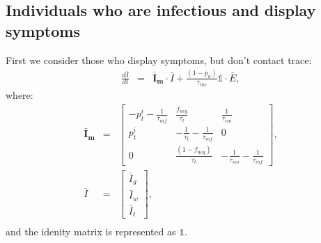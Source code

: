 \documentclass[notitlepage, superscriptaddress]{revtex4-2}
\begin{document}
\subsection{Individuals who are infectious and display symptoms}
First we consider those who display symptoms, but don't contact trace:
\begin{eqnarray}
\frac{d\bar{I}}{dt} &=& \boldsymbol{\bar{I}_{m}} \cdot  \bar{I} + \frac{(1-p_{a})}{\tau_{inc}} \mathbb{1} \cdot \bar{E}, 
\end{eqnarray}
where:
%
\begin{eqnarray}
\boldsymbol{\bar{I}_{m}} &=&
\begin{bmatrix}
- p^{i}_{t} -\frac{1}{\tau_{inf}}  &  \frac{f_{neg}}{\tau_{t}}            & \frac{1}{\tau_{iso}} \\ 
 p^{i}_{t}              & -\frac{1}{\tau_{t}} -\frac{1}{\tau_{inf}}       & 0  \\ 
 0                  & \frac{(1- f_{neg})}{\tau_{t}}                        & -\frac{1}{\tau_{iso}} -\frac{1}{\tau_{inf}}
\end{bmatrix}, \\ 
%
\bar{I} &=& 
\begin{bmatrix}
\bar{I}_{g} \\ \bar{I}_{w}\\ \bar{I}_{t}
\end{bmatrix}, \\ 
%
%
\end{eqnarray}
and the idenity matrix is represented as $\mathbb{1}$.
\end{document}
